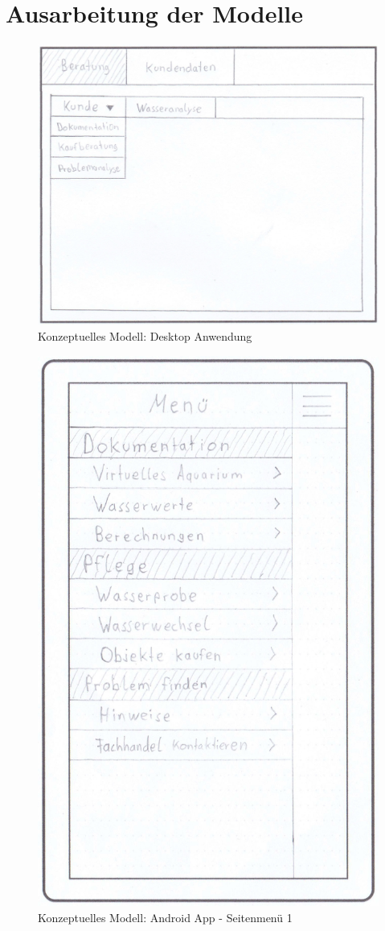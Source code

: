 \section{Ausarbeitung der Modelle}

\begin{figure}[htbp]
\centering
\includegraphics[width=\linewidth]{KModell1}
\caption{Konzeptuelles Modell: Desktop Anwendung}
\label{kmodell1}
\end{figure}

\begin{figure}[htbp]
\centering
\includegraphics[width=0.4\linewidth]{KModell2_1}
\caption{Konzeptuelles Modell: Android App - Seitenmenü 1}
\label{kmodell21}
\end{figure}

